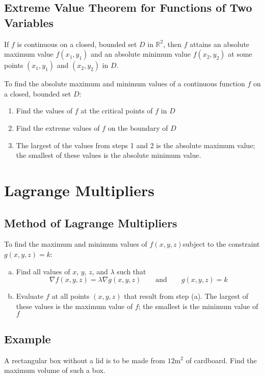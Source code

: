 \subsection*{Extreme Value Theorem for Functions of Two Variables}
If $f$ is continuous on a closed, bounded set $D$ in $\mathbb{R}^2$, then $f$
attains an absolute maximum value $f(x_1, y_1)$ and an absolute minimum value $f(x_2, y_2)$
at some points $(x_1, y_1)$ and $(x_2, y_2)$ in $D$.

To find the absolute maximum and minimum values of a continuous function $f $
on a closed, bounded set $D$:
\begin{enumerate}
    \item Find the values of $f$ at the critical points of $f$ in $D$
    \item Find the extreme values of $f$ on the boundary of $D$
    \item The largest of the values from steps 1 and 2 is the absolute maximum value;
          the smallest of these values is the absolute minimum value.
\end{enumerate}

\section{Lagrange Multipliers}

\subsection*{Method of Lagrange Multipliers}
To find the maximum and minimum values of $f(x, y, z) $subject to the
constraint $g(x, y, z) = k$:
\begin{enumerate}[(a)]
    \item Find all values of $x$, $y$, $z$, and $\lambda$ such that
          $$\nabla f(x,y,z)=\lambda\nabla g(x,y,z) \qquad \text{and} \qquad g(x,y,z)=k$$
    \item Evaluate $f$ at all points $(x, y, z)$ that result from step (a). The largest
          of these values is the maximum value of $f$; the smallest is the minimum value of $f$
\end{enumerate}

\subsection*{Example}
A rectangular box without a lid is to be made from $12\text{m}^2$ of cardboard.
Find the maximum volume of such a box.

